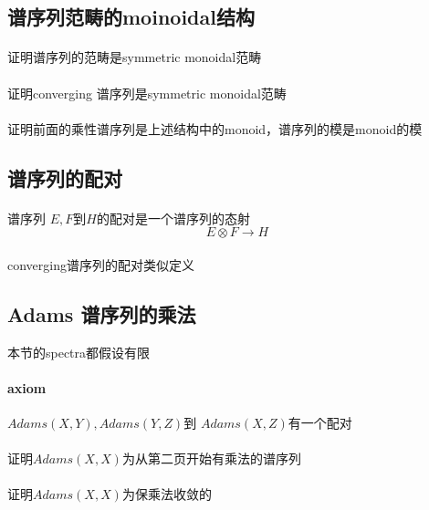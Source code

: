 \documentclass[12pt]{article}
\begin{document}
\subsection{谱序列范畴的moinoidal结构}

\paragraph{}证明谱序列的范畴是symmetric monoidal范畴

\paragraph{}证明converging 谱序列是symmetric monoidal范畴

\paragraph{}证明前面的乘性谱序列是上述结构中的monoid，谱序列的模是monoid的模

\subsection{谱序列的配对}

\paragraph{}谱序列 $E,F$到$H$的配对是一个谱序列的态射
$$E\otimes F \rightarrow H$$

\paragraph{}
converging谱序列的配对类似定义

\subsection{Adams 谱序列的乘法}
本节的spectra都假设有限
 
\paragraph{axiom}
$Adams(X,Y), Adams(Y,Z)$到 $Adams(X,Z)$有一个配对

\paragraph{}证明$Adams(X,X)$为从第二页开始有乘法的谱序列

\paragraph{}证明$Adams(X,X)$为保乘法收敛的
\end{document}
